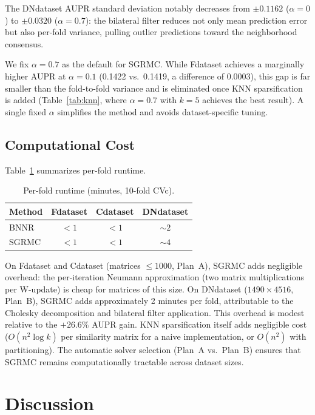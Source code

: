 \documentclass[webpdf,modern,large]{oup-authoring-template}
\begin{document}
The DNdataset AUPR standard deviation notably decreases from $\pm 0.1162$ ($\alpha=0$) to $\pm 0.0320$ ($\alpha=0.7$): the bilateral filter reduces not only mean prediction error but also per-fold variance, pulling outlier predictions toward the neighborhood consensus.

We fix $\alpha = 0.7$ as the default for SGRMC. While Fdataset achieves a marginally higher AUPR at $\alpha = 0.1$ (0.1422 vs.\ 0.1419, a difference of 0.0003), this gap is far smaller than the fold-to-fold variance and is eliminated once KNN sparsification is added (Table~\ref{tab:knn}, where $\alpha=0.7$ with $k=5$ achieves the best result). A single fixed $\alpha$ simplifies the method and avoids dataset-specific tuning.

\subsection{Computational Cost}

Table~\ref{tab:cost} summarizes per-fold runtime.

\begin{table}[htbp]
\centering
\caption{Per-fold runtime (minutes, 10-fold CVc).}
\label{tab:cost}
\begin{tabular}{lccc}
\toprule
Method & Fdataset & Cdataset & DNdataset \\
\midrule
BNNR & ${<}1$ & ${<}1$ & ${\sim}2$ \\
SGRMC & ${<}1$ & ${<}1$ & ${\sim}4$ \\
\bottomrule
\end{tabular}
\end{table}

On Fdataset and Cdataset (matrices $\le 1000$, Plan~A), SGRMC adds negligible overhead: the per-iteration Neumann approximation (two matrix multiplications per W-update) is cheap for matrices of this size. On DNdataset ($1490 \times 4516$, Plan~B), SGRMC adds approximately 2 minutes per fold, attributable to the Cholesky decomposition and bilateral filter application. This overhead is modest relative to the $+26.6\%$ AUPR gain. KNN sparsification itself adds negligible cost ($O(n^2 \log k)$ per similarity matrix for a naive implementation, or $O(n^2)$ with partitioning). The automatic solver selection (Plan~A vs.\ Plan~B) ensures that SGRMC remains computationally tractable across dataset sizes.

\section{Discussion}
\end{document}
